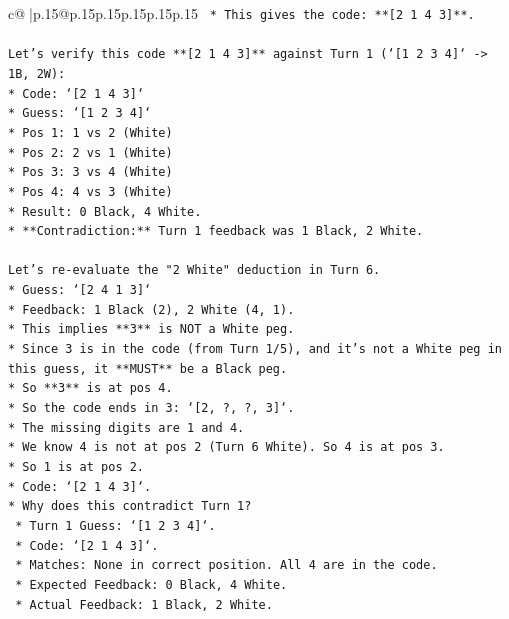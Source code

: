 \documentclass{article}
\begin{document}
{\begin{supertabular}{c@{$\;$}|p{.15\linewidth}@{}p{.15\linewidth}p{.15\linewidth}p{.15\linewidth}p{.15\linewidth}p{.15\linewidth}}
{{{\texttt{    *   This gives the code: **{[}2 1 4 3{]}**.} \\
\\ 
\texttt{Let's verify this code **{[}2 1 4 3{]}** against Turn 1 (`{[}1 2 3 4{]}` {-}> 1B, 2W):} \\
\texttt{*   Code: `{[}2 1 4 3{]}`} \\
\texttt{*   Guess: `{[}1 2 3 4{]}`} \\
\texttt{*   Pos 1: 1 vs 2 (White)} \\
\texttt{*   Pos 2: 2 vs 1 (White)} \\
\texttt{*   Pos 3: 3 vs 4 (White)} \\
\texttt{*   Pos 4: 4 vs 3 (White)} \\
\texttt{*   Result: 0 Black, 4 White.} \\
\texttt{*   **Contradiction:** Turn 1 feedback was 1 Black, 2 White.} \\
\\ 
\texttt{Let's re{-}evaluate the "2 White" deduction in Turn 6.} \\
\texttt{*   Guess: `{[}2 4 1 3{]}`} \\
\texttt{*   Feedback: 1 Black (2), 2 White (4, 1).} \\
\texttt{*   This implies **3** is NOT a White peg.} \\
\texttt{*   Since 3 is in the code (from Turn 1/5), and it's not a White peg in this guess, it **MUST** be a Black peg.} \\
\texttt{*   So **3** is at pos 4.} \\
\texttt{*   So the code ends in 3: `{[}2, ?, ?, 3{]}`.} \\
\texttt{*   The missing digits are 1 and 4.} \\
\texttt{*   We know 4 is not at pos 2 (Turn 6 White). So 4 is at pos 3.} \\
\texttt{*   So 1 is at pos 2.} \\
\texttt{*   Code: `{[}2 1 4 3{]}`.} \\
\texttt{*   Why does this contradict Turn 1?} \\
\texttt{    *   Turn 1 Guess: `{[}1 2 3 4{]}`.} \\
\texttt{    *   Code: `{[}2 1 4 3{]}`.} \\
\texttt{    *   Matches: None in correct position. All 4 are in the code.} \\
\texttt{    *   Expected Feedback: 0 Black, 4 White.} \\
\texttt{    *   Actual Feedback: 1 Black, 2 White.} \\
}}}
\end{supertabular}}
\end{document}

